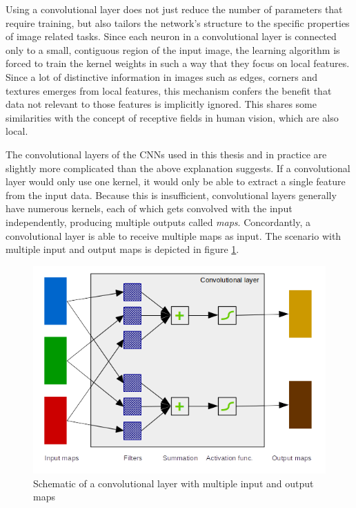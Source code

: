 \documentclass[11pt, a4paper]{article}
\begin{document}
Using a convolutional layer does not just reduce the number of parameters that require training, but also tailors the network's structure to the specific properties of image related tasks. Since each neuron in a convolutional layer is connected only to a small, contiguous region of the input image, the learning algorithm is forced to train the kernel weights in such a way that they focus on local features. Since a lot of distinctive information in images such as edges, corners and textures emerges from local features, this mechanism confers the benefit that data not relevant to those features is implicitly ignored. This shares some similarities with the concept of receptive fields in human vision, which are also local.

The convolutional layers of the CNNs used in this thesis and in practice are slightly more complicated than the above explanation suggests. If a convolutional layer would only use one kernel, it would only be able to extract a single feature from the input data. Because this is insufficient, convolutional layers generally have numerous kernels, each of which gets convolved with the input independently, producing multiple outputs called \emph{maps}. Concordantly, a convolutional layer is able to receive multiple maps as input. The scenario with multiple input and output maps is depicted in figure \ref{fig:convolutional-layer-maps}.

\begin{figure}[htb]
	\centering
	\includegraphics[scale=1.00]{images/convolution_layer_maps.png}
	\caption{Schematic of a convolutional layer with multiple input and output maps}
	\label{fig:convolutional-layer-maps}
\end{figure}
\end{document}
